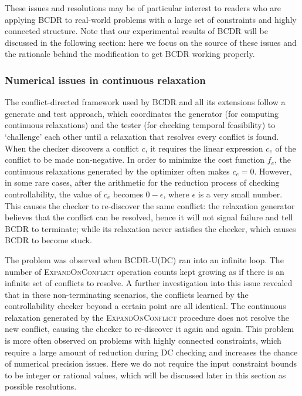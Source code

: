 \documentclass[jair,twoside,11pt,theapa]{article}
\begin{document}
These issues and resolutions may be of particular interest to readers who are
applying BCDR to real-world problems with a large set of constraints and highly
connected structure. Note that our experimental results of BCDR will be
discussed in the following section: here we focus on the source of these
issues and the rationale behind the modification to get BCDR working properly.


\subsubsection{Numerical issues in continuous relaxation}



The conflict-directed framework used by BCDR and all
its extensions follow a generate and test approach, which coordinates
the generator (for computing continuous relaxations) and the tester (for checking
temporal feasibility) to `challenge' each other until a relaxation
that resolves every conflict is found. When the checker discovers a conflict
$c$, it requires the linear expression $c_e$ of the conflict to be made
non-negative. In order to minimize the cost function $f_e$, the continuous
relaxations generated by the optimizer often makes $c_e = 0$. However, in some
rare cases, after the arithmetic for the reduction process of checking
controllability, the value of $c_e$ becomes $0 - \epsilon$, where $\epsilon$ is
a very small number. This causes the checker to re-discover the same conflict:
the relaxation generator believes that the conflict can be resolved, hence it
will not signal failure and tell BCDR to terminate; while its relaxation
never satisfies the checker, which causes BCDR to become stuck.


The problem was observed when BCDR-U(DC) ran into an infinite loop. The number of \textsc{ExpandOnConflict} operation
counts kept growing as if there is an infinite set of conflicts to resolve. A
further investigation into this issue revealed that in these non-terminating
scenarios, the conflicts learned by the controllability checker beyond a certain
point are all identical. The continuous relaxation generated by the
\textsc{ExpandOnConflict} procedure does not resolve the new conflict, causing
the checker to re-discover it again and again. This problem is more often
observed on problems with highly connected constraints, which require a large
amount of reduction during DC checking and increases the chance of numerical
precision issues. Here we do not require the input constraint bounds to be integer or rational values, which will be discussed later in this section as possible resolutions.
\end{document}
